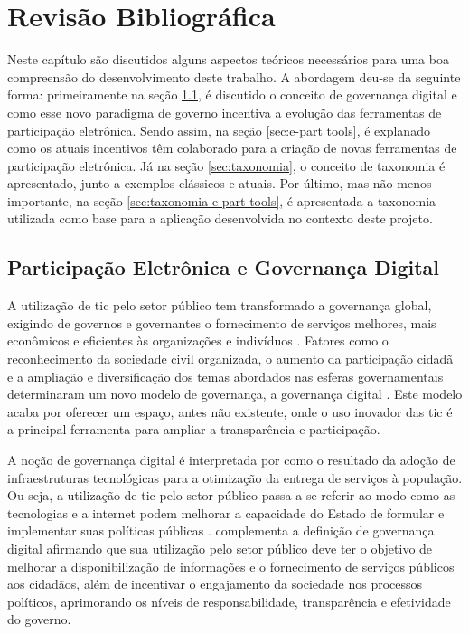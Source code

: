 \chapter[Revisão Bibliográfica]{Revisão Bibliográfica} 
\label{cap:cap2}
Neste capítulo são discutidos alguns aspectos teóricos necessários para uma boa compreensão do desenvolvimento deste trabalho. A abordagem deu-se da seguinte forma:
primeiramente na seção \ref{sec:e-part}, é discutido o conceito de governança digital e como esse novo paradigma de governo incentiva a evolução das ferramentas de 
participação eletrônica. Sendo assim, na seção \ref{sec:e-part tools}, é explanado como os atuais incentivos têm colaborado para a criação de novas ferramentas de 
participação eletrônica. Já na seção \ref{sec:taxonomia}, o conceito de taxonomia é apresentado, junto a exemplos clássicos e atuais. Por último, mas não menos importante, 
na seção \ref{sec:taxonomia e-part tools}, é apresentada a taxonomia utilizada como base para a aplicação desenvolvida no contexto deste projeto. 


\section{Participação Eletrônica e Governança Digital}
\label{sec:e-part}
\par
A utilização de \acrshort{tic} pelo setor público tem transformado a governança global, exigindo de governos e governantes o fornecimento de serviços melhores, 
mais econômicos e eficientes às organizações e indivíduos \cite{afdb2014uneca}. Fatores como o reconhecimento da sociedade civil organizada, o aumento da participação cidadã e a 
ampliação e diversificação dos temas abordados nas esferas governamentais determinaram um novo modelo de governança, a governança digital \cite{o2011government}. 
Este modelo acaba por oferecer um espaço, antes não existente, onde o uso inovador das \acrshort{tic} é a principal ferramenta para ampliar a transparência e participação.

\par
A noção de governança digital é interpretada por  como o resultado da adoção de infraestruturas tecnológicas para a otimização da entrega de 
serviços à população. Ou seja, a utilização de \acrshort{tic} pelo setor público passa a se referir ao modo como as tecnologias e a internet podem melhorar a capacidade do Estado 
de formular e implementar suas políticas públicas \cite{parra2017governancca}.  complementa a definição de governança digital afirmando que sua 
utilização pelo setor público deve ter o objetivo de melhorar a disponibilização de informações e o fornecimento de serviços públicos aos cidadãos, 
além de incentivar o engajamento da sociedade nos processos políticos, aprimorando os níveis de responsabilidade, transparência e efetividade do governo.

